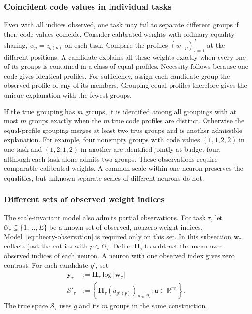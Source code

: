 \subsubsection{Coincident code values in individual tasks}
\label{app:theory-code-collisions}

Even with all indices observed, one task may fail to separate
different groups if their code values coincide.
Consider calibrated weights with ordinary equality sharing,
$w_p=c_{g(p)}$ on each task. Compare the profiles
$(w_{\tau,p})_{\tau=1}^T$ at the different positions.
A candidate explains all these weights exactly when every one
of its groups is contained in a class of equal profiles.
Necessity follows because one code gives identical profiles.
For sufficiency, assign each candidate group the observed profile
of any of its members. Grouping equal profiles therefore gives
the unique explanation with the fewest groups.

If the true grouping has $m$ groups, it is identified among all
groupings with at most $m$ groups exactly when the $m$ true code
profiles are distinct. Otherwise the equal-profile grouping
merges at least two true groups and is another admissible
explanation. For example, four nonempty groups with code values
$(1,1,2,2)$ in one task and $(1,2,1,2)$ in another are identified
jointly at budget four, although each task alone admits two groups.
These observations require comparable calibrated weights.
A common scale within one neuron preserves the equalities, but
unknown separate scales of different neurons do not.

\subsubsection{Different sets of observed weight indices}
\label{app:theory-observed-masks}

The scale-invariant model also admits partial observations.
For task $\tau$, let
$\mathcal O_\tau\subseteq\{1,\ldots,E\}$ be a known set of observed,
nonzero weight indices. Model~\eqref{eq:theory-observation} is
required only on this set. In this subsection $\mathbf w_\tau$
collects just the entries with $p\in\mathcal O_\tau$.
Define $\boldsymbol\Pi_\tau$ to subtract the mean over observed
indices of each neuron. A neuron with one observed index gives
zero contrast. For each candidate $g'$, set
\begin{equation}
    \begin{aligned}
        \mathbf y_\tau
            &:=\boldsymbol\Pi_\tau
                   \log|\mathbf w_\tau|,\\
        \mathcal S'_\tau
            &:=\left\{
                 \boldsymbol\Pi_\tau
                    (u_{g'(p)})_{p\in\mathcal O_\tau}:
                 \mathbf u\in\mathbb R^{m'}
                 \right\}.
    \end{aligned}
    \label{eq:appendix-theory-partial-spaces}
\end{equation}
The true space $\mathcal S_\tau$ uses $g$ and its $m$ groups in
the same construction.

